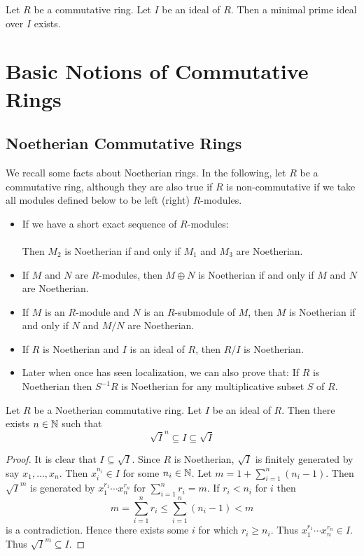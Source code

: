 \documentclass[a4paper]{article}
\begin{document}
\begin{prp}{}{} Let $R$ be a commutative ring. Let $I$ be an ideal of $R$. Then a minimal prime ideal over $I$ exists. 
\end{prp}

\pagebreak
\section{Basic Notions of Commutative Rings}
\subsection{Noetherian Commutative Rings}
We recall some facts about Noetherian rings. In the following, let $R$ be a commutative ring, although they are also true if $R$ is non-commutative if we take all modules defined below to be left (right) $R$-modules. 

\begin{itemize}
\item If we have a short exact sequence of $R$-modules: \\
\\
Then $M_2$ is Noetherian if and only if $M_1$ and $M_3$ are Noetherian. 
\item If $M$ and $N$ are $R$-modules, then $M\oplus N$ is Noetherian if and only if $M$ and $N$ are Noetherian. 
\item If $M$ is an $R$-module and $N$ is an $R$-submodule of $M$, then $M$ is Noetherian if and only if $N$ and $M/N$ are Noetherian.
\item If $R$ is Noetherian and $I$ is an ideal of $R$, then $R/I$ is Noetherian. 
\item Later when once has seen localization, we can also prove that: If $R$ is Noetherian then $S^{-1}R$ is Noetherian for any multiplicative subset $S$ of $R$. 
\end{itemize}

\begin{prp}{}{} Let $R$ be a Noetherian commutative ring. Let $I$ be an ideal of $R$. Then there exists $n\in\mathbb{N}$ such that $$\sqrt{I}^n\subseteq I\subseteq\sqrt{I}$$ 
\begin{proof}
It is clear that $I\subseteq\sqrt{I}$. Since $R$ is Noetherian, $\sqrt{I}$ is finitely generated by say $x_1,\dots,x_n$. Then $x_i^{n_i}\in I$ for some $n_i\in\mathbb{N}$. Let $m=1+\sum_{i=1}^n(n_i-1)$. Then $\sqrt{I}^m$ is generated by $x_1^{r_1}\cdots x_n^{r_n}$ for $\sum_{i=1}^nr_i=m$. If $r_i<n_i$ for $i$ then $$m=\sum_{i=1}^nr_i\leq\sum_{i=1}^n(n_i-1)<m$$ is a contradiction. Hence there exists some $i$ for which $r_i\geq n_i$. Thus $x_1^{r_1}\cdots x_n^{r_n}\in I$. Thus $\sqrt{I}^m\subseteq I$. 
\end{proof}
\end{prp}
\end{document}
